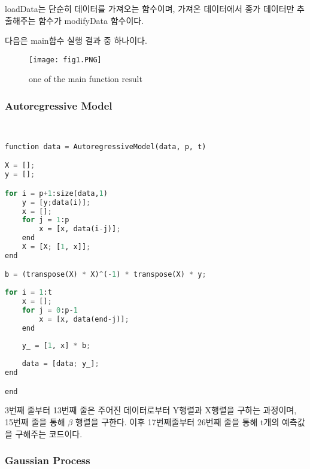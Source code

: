 \documentclass[manuscript,screen,review]{acmart}
\begin{document}
loadData는 단순히 데이터를 가져오는 함수이며, 가져온 데이터에서 종가 데이터만 추출해주는 함수가 modifyData 함수이다.

다음은 main함수 실행 결과 중 하나이다.

\begin{figure}[h] %
\begin{center}
\texttt{[image: fig1.PNG]}
\end{center}
\caption{one of the main function result}
\label{fig:long}
\label{fig:onecol}
\end{figure}

\subsubsection{Autoregressive Model}\

\begin{lstlisting}[language=python, caption=AutoregressiveModel] 
function data = AutoregressiveModel(data, p, t)

X = [];
y = [];

for i = p+1:size(data,1)
    y = [y;data(i)];
    x = [];
    for j = 1:p
        x = [x, data(i-j)];
    end
    X = [X; [1, x]];
end

b = (transpose(X) * X)^(-1) * transpose(X) * y;
    
for i = 1:t
    x = [];
    for j = 0:p-1
        x = [x, data(end-j)];
    end
    
    y_ = [1, x] * b;
    
    data = [data; y_];
end

end
\end{lstlisting}

3번째 줄부터 13번째 줄은 주어진 데이터로부터 Y행렬과 X행렬을 구하는 과정이며, 15번째 줄을 통해 $\beta$ 행렬을 구한다.
이후 17번째줄부터 26번째 줄을 통해 t개의 예측값을 구해주는 코드이다.

\subsubsection{Gaussian Process}\
\end{document}
